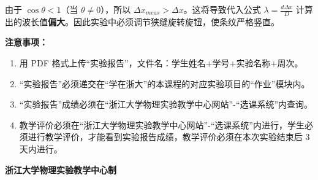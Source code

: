 \documentclass[10pt,a4paper]{ctexart}
\newcommand{\sihao}{\fontsize{14pt}{18pt}\selectfont}
\newcommand{\xiaosi}{\fontsize{12pt}{16pt}\selectfont}
\begin{document}
    由于 $\cos \theta < 1$（当 $\theta \neq 0$），所以 $\Delta x_{meas} > \Delta x$。这将导致代入公式 $\lambda = \frac{d \Delta x}{D}$ 计算出的波长值\textbf{偏大}。因此实验中必须调节狭缝旋转旋钮，使条纹严格竖直。

\newpage

\sihao\textbf{注意事项：}
\xiaosi
\begin{enumerate}
    \item  用 PDF 格式上传“实验报告”，文件名：学生姓名+学号+实验名称+周次。
    \item  “实验报告”必须递交在“学在浙大”的本课程的对应实验项目的“作业”模块内。
    \item  “实验报告”成绩必须在“浙江大学物理实验教学中心网站”-“选课系统”内查询。
    \item 教学评价必须在“浙江大学物理实验教学中心网站”-“选课系统”内进行，学生必须进行教学评价，才能看到实验报告成绩，教学评价必须在本次实验结束后 3 天内进行。
\end{enumerate}

\vspace{1cm}
\xiaosi\centering \textbf{浙江大学物理实验教学中心制}
\end{document}
